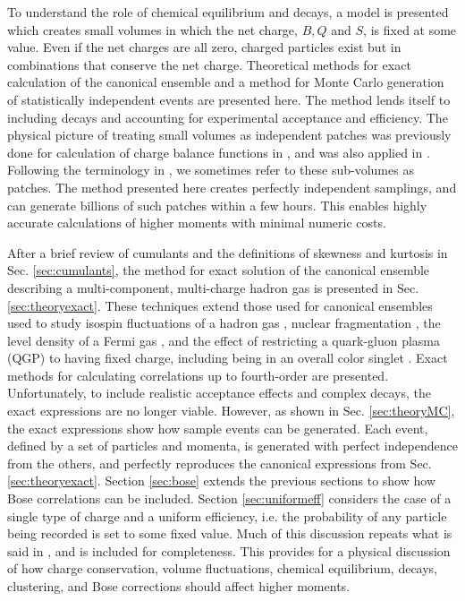 To understand the role of chemical equilibrium and decays, a model is presented which creates small volumes in which the net charge, $B,Q$ and $S$, is fixed at some value. Even if the net charges are all zero, charged particles exist but in combinations that conserve the net charge. Theoretical methods for exact calculation of the canonical ensemble and a method for Monte Carlo generation of statistically independent events are presented here. The method lends itself to including decays and accounting for experimental acceptance and efficiency. The physical picture of treating small volumes as independent patches was previously done for calculation of charge balance functions in \cite{Schlichting:2010qia,Schlichting:2010na}, and was also applied in \cite{Oliinychenko:2020cmr}. Following the terminology in \cite{Oliinychenko:2020cmr}, we sometimes refer to these sub-volumes as patches. The method presented here creates perfectly independent samplings, and can generate billions of such patches within a few hours. This enables highly accurate calculations of higher moments with minimal numeric costs.

After a brief review of cumulants and the definitions of skewness and kurtosis in Sec. \ref{sec:cumulants}, the method for exact solution of the canonical ensemble describing a multi-component, multi-charge hadron gas is presented in Sec. \ref{sec:theoryexact}. These techniques extend those used for canonical ensembles used to study isospin fluctuations of a hadron gas \cite{Cheng:2002jb}, nuclear fragmentation \cite{Pratt:1999ht}, the level density of a Fermi gas \cite{Pratt:1999ns}, and the effect of restricting a quark-gluon plasma (QGP) to having fixed charge, including being in an overall color singlet \cite{Pratt:2003jd}. Exact methods for calculating correlations up to fourth-order are presented. Unfortunately, to include realistic acceptance effects and complex decays, the exact expressions are no longer viable. However, as shown in Sec. \ref{sec:theoryMC}, the exact expressions show how sample events can be generated. Each event, defined by a set of particles and momenta, is generated with perfect independence from the others, and perfectly reproduces the canonical expressions from Sec. \ref{sec:theoryexact}. Section \ref{sec:bose} extends the previous sections to show how Bose correlations can be included. Section \ref{sec:uniformeff} considers the case of a single type of charge and a uniform efficiency, i.e. the probability of any particle being recorded is set to some fixed value. Much of this discussion repeats what is said in \cite{Savchuk:2019xfg}, and is included for completeness. This provides for a physical discussion of how charge conservation, volume fluctuations, chemical equilibrium, decays, clustering, and Bose corrections should affect higher moments.

